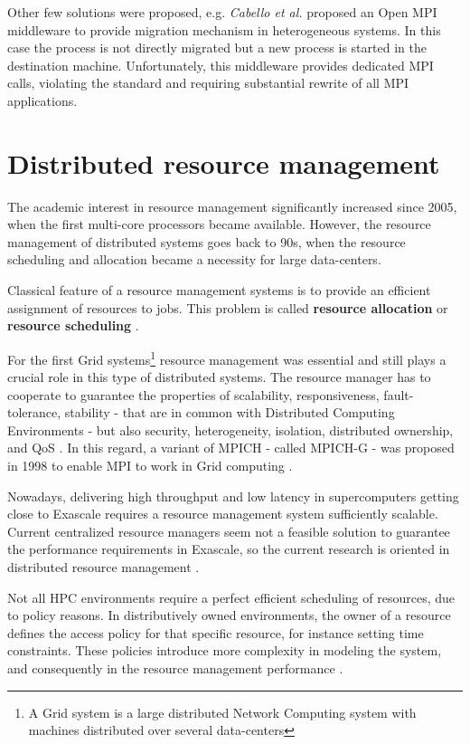 Other few solutions were proposed, e.g. \emph{Cabello et al.}
\cite{cabello2014fault}
proposed an Open MPI middleware to provide migration mechanism
in heterogeneous systems. In this case the process is not directly migrated
but a new process is started in the destination machine. Unfortunately, this
middleware provides dedicated MPI calls, violating the standard and requiring
substantial rewrite of all MPI applications.

\section{Distributed resource management}
The academic interest in resource management significantly increased
since 2005,
when the first multi-core processors became available. However, the resource
management of distributed systems goes back to 90s, when the resource
scheduling and allocation became a necessity for large data-centers. 

Classical feature of a resource management systems is to provide an efficient
assignment of resources to jobs. This problem is called \textbf{resource
allocation} or \textbf{resource scheduling} \cite{raman1998matchmaking}.

For the first Grid systems\footnote{A Grid system is a large distributed
Network Computing system with machines distributed over several data-centers}
resource management was essential and still plays a crucial role in this type
of distributed systems. The resource manager has to cooperate to guarantee
the properties
of scalability, responsiveness, fault-tolerance, stability - that are in 
common with Distributed Computing Environments - but also security,
heterogeneity, isolation, distributed ownership, and QoS
\cite{krauter2002taxonomy}. In this regard, a variant of MPICH
- called MPICH-G - was proposed in 1998 to enable MPI to work in Grid computing
\cite{foster1998grid}.

Nowadays, delivering high throughput and low latency in supercomputers getting
close to Exascale requires a resource management system sufficiently
scalable. Current centralized resource managers seem not a feasible solution
to guarantee the performance requirements in Exascale, so the current
research is oriented in distributed resource management \cite{wang2014next}.

Not all HPC environments require a perfect efficient scheduling of resources,
due to policy reasons. In distributively owned environments, the owner of
a resource defines the access policy for that specific resource, for
instance setting
time constraints. These policies introduce more complexity in modeling
the system, and consequently in the resource management performance
\cite{raman1998matchmaking}.

